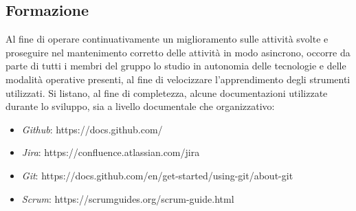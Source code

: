 \subsection{Formazione}
Al fine di operare continuativamente un miglioramento sulle attività svolte e proseguire nel mantenimento corretto delle attività in modo asincrono, occorre da parte di tutti i membri del gruppo lo studio in autonomia delle tecnologie e delle modalità operative presenti, al fine di velocizzare l'apprendimento degli strumenti utilizzati. Si listano, al fine di
completezza, alcune documentazioni utilizzate durante lo sviluppo, sia a livello documentale che organizzativo:

\begin{itemize}
    \item \textit{Github}: https://docs.github.com/
    \item \textit{Jira}: https://confluence.atlassian.com/jira
    \item \textit{Git}: https://docs.github.com/en/get-started/using-git/about-git
    \item \textit{Scrum}: https://scrumguides.org/scrum-guide.html
\end{itemize}